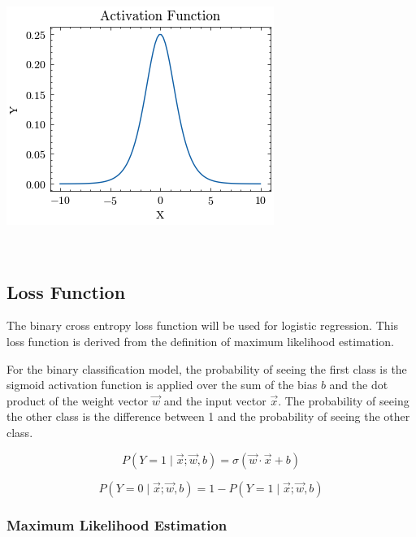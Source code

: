 \documentclass[openany]{book}
\begin{document}
    \begin{center}
    \includegraphics[width=\textwidth]{combined_files/combined_75_0.png}
    \end{center}
    { \hspace*{\fill} \\}
    
    \subsection{Loss Function}\label{loss-function}

The binary cross entropy loss function will be used for logistic
regression. This loss function is derived from the definition of maximum
likelihood estimation.

For the binary classification model, the probability of seeing the first
class is the sigmoid activation function is applied over the sum of the
bias \(b\) and the dot product of the weight vector \(\vec{w}\) and the
input vector \(\vec{x}\). The probability of seeing the other class is
the difference between 1 and the probability of seeing the other class.

\[ P(Y=1 \mid \vec{x}; \vec{w}, b) = \sigma{(\vec{w} \cdot \vec{x} + b)}
\]

\[ P(Y=0 \mid \vec{x}; \vec{w}, b) = 1 - P(Y=1 \mid \vec{x}; \vec{w}, b)
\]

    \subsubsection{Maximum Likelihood
Estimation}\label{maximum-likelihood-estimation}
\end{document}
